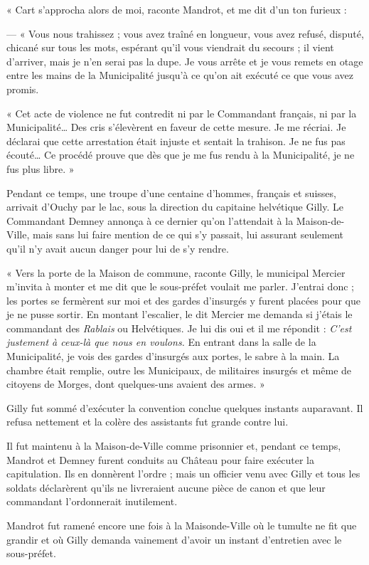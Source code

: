 \documentclass[french,twoside]{book} %
\newenvironment{quoteblock}%
  {\begin{quoting}}
  {\end{quoting}}
\newenvironment{quotebar}{%
    \def\FrameCommand{{\color{rubric!10!}\vrule width 0.5em} \hspace{0.9em}}%
    \def\OuterFrameSep{\itemsep} %
    \MakeFramed {\advance\hsize-\width \FrameRestore}
  }%
  {%
    \endMakeFramed
  }
\renewenvironment{quoteblock}%
  {%
    \savenotes
    \setstretch{0.9}
    \begin{quotebar}
  }
  {%
    \end{quotebar}
    \spewnotes
  }
\begin{document}
\begin{quoteblock}
 \noindent « Cart s’approcha alors de moi, raconte Mandrot, et me dit d’un ton furieux :\par
 — « Vous nous trahissez ; vous avez traîné en longueur, vous avez refusé, disputé, chicané sur tous les mots, espérant qu’il vous viendrait du secours ; il vient d’arriver, mais je n’en serai pas la dupe. Je vous arrête et je vous remets en otage entre les mains de la Municipalité jusqu’à ce qu’on ait exécuté ce que vous avez promis.\par
 « Cet acte de violence ne fut contredit ni par le Commandant français, ni par la Municipalité… Des cris s’élevèrent en faveur de cette mesure. Je me récriai. Je déclarai que cette arrestation était injuste et sentait la trahison. Je ne fus pas écouté… Ce procédé prouve que dès que je me fus rendu à la Municipalité, je ne fus plus libre. »
 \end{quoteblock}

\noindent Pendant ce temps, une troupe d’une centaine d’hommes, français et suisses, arrivait d’Ouchy par le lac, sous la direction du capitaine helvétique Gilly. Le Commandant Demney annonça à ce dernier qu’on l’attendait à la Maison-de-Ville, mais sans lui faire mention de ce qui s’y passait, lui assurant seulement qu’il n’y avait aucun danger pour lui de s’y rendre.\par

\begin{quoteblock}
 \noindent « Vers la porte de la Maison de commune, raconte Gilly, le municipal Mercier m’invita à monter et me dit que le sous-préfet voulait me parler. J’entrai donc ; les portes se fermèrent sur moi et des gardes d’insurgés y furent placées pour que je ne pusse sortir. En montant l’escalier, le dit Mercier me demanda si j’étais le commandant des \emph{Rablais} ou Helvétiques. Je lui dis oui et il me répondit : \emph{C’est justement à ceux-là que nous en voulons.} En entrant dans la salle de la Municipalité, je vois des gardes d’insurgés aux portes, le sabre à la main. La chambre était remplie, outre les Municipaux, de militaires insurgés et même de citoyens de Morges, dont quelques-uns avaient des armes. »
 \end{quoteblock}

\noindent Gilly fut sommé d’exécuter la convention conclue quelques instants auparavant. Il refusa nettement et la colère des assistants fut grande contre lui.\par
Il fut maintenu à la Maison-de-Ville comme prisonnier et, pendant ce temps, Mandrot et Demney furent conduits au Château pour faire exécuter la capitulation. Ils en donnèrent l’ordre ; mais un officier venu avec Gilly et tous les soldats déclarèrent qu’ils ne livreraient aucune pièce de canon et que leur commandant l’ordonnerait inutilement.\par
Mandrot fut ramené encore une fois à la Maisonde-Ville où le tumulte ne fit que grandir et où Gilly demanda vainement d’avoir un instant d’entretien avec le sous-préfet.\par
\end{document}
